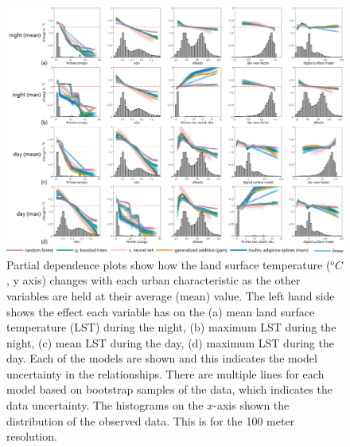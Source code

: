 \documentclass[final,3p,times,twocolumn,sort&compress]{elsarticle}
\begin{document}
\begin{figure}
    \centering
    \includegraphics[width=\linewidth]{fig/report/pdp_100.png}
    \caption[Partial dependence plots for LST at 100 meter resolution]{
    Partial dependence plots show how the land surface temperature ($^oC$, y axis) changes with each urban characteristic as the other variables are held at their average (mean) value. 
    The left hand side shows the effect each variable has on the (a) mean land surface temperature (LST) during the night, (b) maximum LST during the night, (c) mean LST during the day, (d) maximum LST during the day. 
    Each of the models are shown and this indicates the model uncertainty in the relationships.
    There are multiple lines for each model based on bootstrap samples of the data, which indicates the data uncertainty.
    The histograms on the $x$-axis shown the distribution of the observed data.
    This is for the 100 meter resolution.
    }
    \label{fig:pdp_100}
\end{figure}
\end{document}
